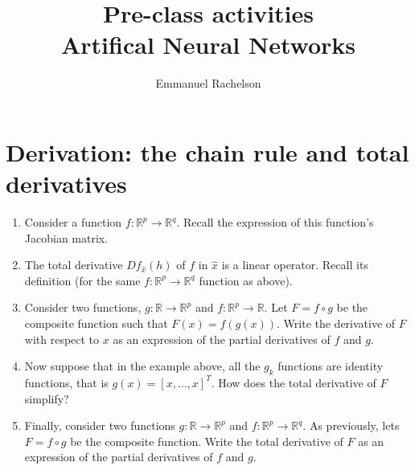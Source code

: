 \documentclass{article}
\author{Emmanuel Rachelson}
\title{Pre-class activities\\Artifical Neural Networks}
\date{}
\newcommand{\R}{\ensuremath{\mathbb{R}}}
\begin{document}
\maketitle

\section{Derivation: the chain rule and total derivatives}

\begin{enumerate}
	\item Consider a function $f:\R^p\rightarrow \R^q$. Recall the expression of this function's Jacobian matrix.
	\item The total derivative $Df_{\hat{x}}(h)$ of $f$ in $\hat{x}$ is a linear operator. Recall its definition (for the same $f:\R^p\rightarrow \R^q$ function as above).
	\item Consider two functions, $g:\R\rightarrow\R^p$ and $f:\R^p\rightarrow\R$. Let $F=f\circ g$ be the composite function such that $F(x)=f(g(x))$. Write the derivative of $F$ with respect to $x$ as an expression of the partial derivatives of $f$ and $g$.
	\item Now suppose that in the example above, all the $g_k$ functions are identity functions, that is $g(x) = [x,\ldots, x]^T$. How does the total derivative of $F$ simplify?
	\item Finally, consider two functions $g:\R\rightarrow \R^p$ and $f:\R^p\rightarrow \R^q$. As previously, lets $F=f\circ g$ be the composite function. Write the total derivative of $F$ as an expression of the partial derivatives of $f$ and $g$.
\end{enumerate}
\end{document}
